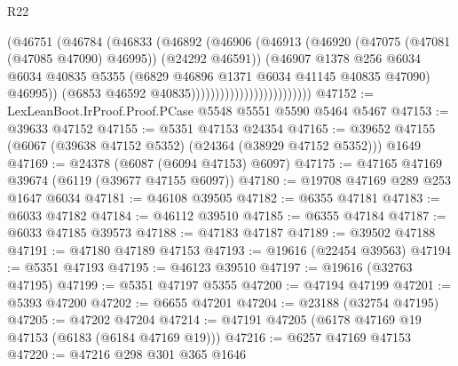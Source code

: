 \begin{lexlean}{R22}
\begin{coremodule}
                                          (@46751
                                            (@46784
                                              (@46833
                                                (@46892
                                                  (@46906
                                                    (@46913
                                                      (@46920
                                                        (@47075 (@47081 (@47085 @47090) @46995))
                                                        (@24292 @46591))
                                                      (@46907
                                                        @1378
                                                        @256
                                                        @6034
                                                        @6034
                                                        @40835
                                                        @5355
                                                        (@6829
                                                          @46896
                                                          @1371
                                                          @6034
                                                          @41145
                                                          @40835
                                                          @47090)
                                                        @46995))
                                                    (@6853 @46592 @40835)))))))))))))))))))))))))
@47152 := LexLeanBoot.IrProof.Proof.PCase @5548 @5551 @5590 @5464 @5467
@47153 := @39633 @47152
@47155 := @5351 @47153 @24354
@47165 := @39652 @47155 (@6067 (@39638 @47152 @5352) (@24364 (@38929 @47152 @5352))) @1649
@47169 := @24378 (@6087 (@6094 @47153) @6097)
@47175 := @47165 @47169 @39674 (@6119 (@39677 @47155 @6097))
@47180 := @19708 @47169 @289 @253 @1647 @6034
@47181 := @46108 @39505
@47182 := @6355 @47181
@47183 := @6033 @47182
@47184 := @46112 @39510
@47185 := @6355 @47184
@47187 := @6033 @47185 @39573
@47188 := @47183 @47187
@47189 := @39502 @47188
@47191 := @47180 @47189 @47153
@47193 := @19616 (@22454 @39563)
@47194 := @5351 @47193
@47195 := @46123 @39510
@47197 := @19616 (@32763 @47195)
@47199 := @5351 @47197 @5355
@47200 := @47194 @47199
@47201 := @5393 @47200
@47202 := @6655 @47201
@47204 := @23188 (@32754 @47195)
@47205 := @47202 @47204
@47214 := @47191 @47205 (@6178 @47169 @19 @47153 (@6183 (@6184 @47169 @19)))
@47216 := @6257 @47169 @47153
@47220 := @47216 @298 @301 @365 @1646

\end{coremodule}
\end{lexlean}
